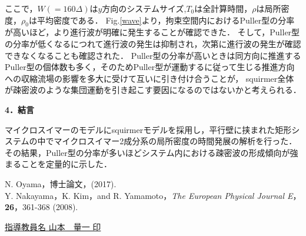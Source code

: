 \documentclass[twocolumns,10pt,a4j]{jarticle}
\begin{document}
  \noindent
ここで，$W(=160\Delta)$は$y$方向のシステムサイズ,$T_0$は全計算時間，$\rho$は局所密度，$\rho_0$は平均密度である．
Fig.\ref{wave}より，拘束空間内におけるPuller型の分率が高いほど，より進行波が明確に発生することが確認できた．
そして，Puller型の分率が低くなるにつれて進行波の発生は抑制され，次第に進行波の発生が確認できなくなることも確認された．
Puller型の分率が高いときは同方向に推進するPuller型の個体数も多く，そのためPuller型が運動するに従って生じる推進方向への収縮流場の影響を多大に受けて互いに引き付け合うことが，
squirmer全体が疎密波のような集団運動を引き起こす要因になるのではないかと考えられる．



  \noindent
  \textbf{\large 4．結言}
  \par
マイクロスイマーのモデルにsquirmerモデルを採用し，平行壁に挟まれた矩形システムの中でマイクロスイマー2成分系の局所密度の時間発展の解析を行った．
その結果，Puller型の分率が多いほどシステム内における疎密波の形成傾向が強まることを定量的に示した．
  \vspace{-7.5truemm}


  \renewcommand{\refname}{\normalsize 参考文献\vspace{-3truemm}}
  \begin{thebibliography}{9}
    N. Oyama，博士論文，(2017).\\
  \vspace{-7truemm}
    Y. Nakayama，K. Kim，and R. Yamamoto，\textit{The European Physical Journal E}，\textbf{26}，361-368 (2008).\\
  \end{thebibliography}


  \vspace{-7truemm}
  \centering
  \underline{指導教員名\hspace{10truemm} 山本　量一 \hspace{20truemm} 印}

\end{document}
